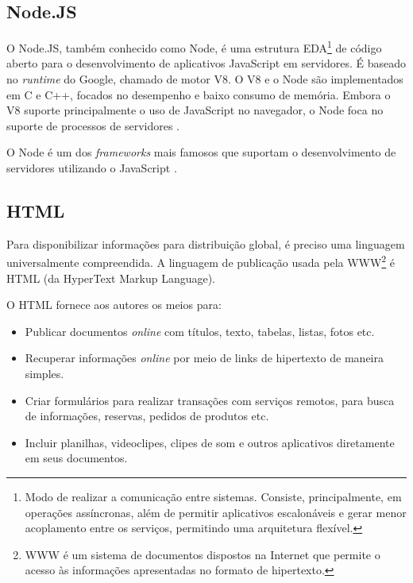 
\subsection{Node.JS}

O Node.JS, também conhecido como Node, é uma estrutura EDA\footnote{Modo de realizar a comunicação entre sistemas. Consiste, principalmente, em operações assíncronas, além de permitir aplicativos escalonáveis e gerar menor acoplamento entre os serviços, permitindo uma arquitetura flexível.} de código aberto para o desenvolvimento de aplicativos JavaScript em servidores. É baseado no \textit{runtime} do Google, chamado de motor V8. O V8 e o Node são implementados em C e C++, focados no desempenho e baixo consumo de memória. Embora o V8 suporte principalmente o uso de JavaScript no navegador, o Node foca no suporte de processos de servidores \cite{Tilkov2010}.

O Node é um dos \textit{frameworks} mais famosos que suportam o desenvolvimento de servidores utilizando o JavaScript \cite{Tilkov2010}.


\subsection{HTML}

Para disponibilizar informações para distribuição global, é preciso uma linguagem universalmente compreendida. A linguagem de publicação usada pela WWW\footnote{WWW é um sistema de documentos dispostos na Internet que permite o acesso às informações apresentadas no formato de hipertexto.} é HTML (da HyperText Markup Language).\citeauthor{html}

O HTML fornece aos autores os meios para: 
\begin{itemize}
    \item Publicar documentos \textit{online} com títulos, texto, tabelas, listas, fotos etc. 
    \item Recuperar informações \textit{online} por meio de links de hipertexto de maneira simples. 
    \item Criar formulários para realizar transações com serviços remotos, para busca de informações, reservas, pedidos de produtos etc. 
    \item Incluir planilhas, videoclipes, clipes de som e outros aplicativos diretamente em seus documentos.
\end{itemize}

